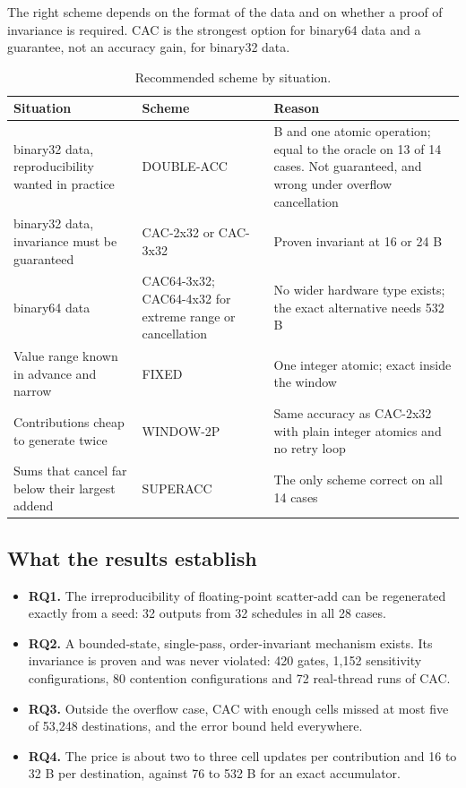 \documentclass[3p,10pt]{elsarticle}
\begin{document}
The right scheme depends on the format of the data and on whether a
proof of invariance is required. CAC is the strongest option for
binary64 data and a guarantee, not an accuracy gain, for binary32 data.

\begin{table}[!htbp]\centering\small\setlength{\tabcolsep}{4pt}
\caption{Recommended scheme by situation.}\label{tab:22}
\begin{tabularx}{\linewidth}{>{\raggedright\arraybackslash\hsize=1.000\hsize}X>{\raggedright\arraybackslash\hsize=1.000\hsize}X>{\raggedright\arraybackslash\hsize=1.000\hsize}X}
\toprule
Situation & Scheme & Reason \\
\midrule
binary32 data, reproducibility wanted in practice & DOUBLE-ACC & 8 B and one atomic operation; equal to the oracle on 13 of 14 cases. Not
guaranteed, and wrong under overflow cancellation \\
binary32 data, invariance must be guaranteed & CAC-2x32 or CAC-3x32 & Proven invariant at 16 or 24 B \\
binary64 data & CAC64-3x32; CAC64-4x32 for extreme range or cancellation & No wider hardware type exists; the exact alternative needs 532 B \\
Value range known in advance and narrow & FIXED & One integer atomic; exact inside the window \\
Contributions cheap to generate twice & WINDOW-2P & Same accuracy as CAC-2x32 with plain integer atomics and no retry loop \\
Sums that cancel far below their largest addend & SUPERACC & The only scheme correct on all 14 cases \\
\bottomrule
\end{tabularx}
\end{table}

\hypertarget{what-the-results-establish}{%
\subsection{What the results
establish}\label{what-the-results-establish}}

\begin{itemize}
\item
  \textbf{RQ1.} The irreproducibility of floating-point scatter-add can
  be regenerated exactly from a seed: 32 outputs from 32 schedules in
  all 28 cases.
\item
  \textbf{RQ2.} A bounded-state, single-pass, order-invariant mechanism
  exists. Its invariance is proven and was never violated: 420 gates,
  1,152 sensitivity configurations, 80 contention configurations and 72
  real-thread runs of CAC.
\item
  \textbf{RQ3.} Outside the overflow case, CAC with enough cells missed
  at most five of 53,248 destinations, and the error bound held
  everywhere.
\item
  \textbf{RQ4.} The price is about two to three cell updates per
  contribution and 16 to 32 B per destination, against 76 to 532 B for
  an exact accumulator.
\end{itemize}
\end{document}
